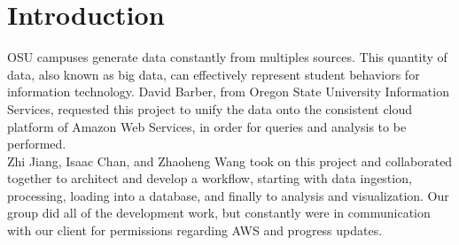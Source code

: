 \section{Introduction}
OSU campuses generate data constantly from multiples sources. This quantity of data, also known as big data, can effectively represent student behaviors for information technology. David Barber, from Oregon State University Information Services, requested this project to unify the data onto the consistent cloud platform of Amazon Web Services, in order for queries and analysis to be performed. \\

\noindent Zhi Jiang, Isaac Chan, and Zhaoheng Wang took on this project and collaborated together to architect and develop a workflow, starting with data ingestion, processing, loading into a database, and finally to analysis and visualization. Our group did all of the development work, but constantly were in communication with our client for permissions regarding AWS and progress updates. \\